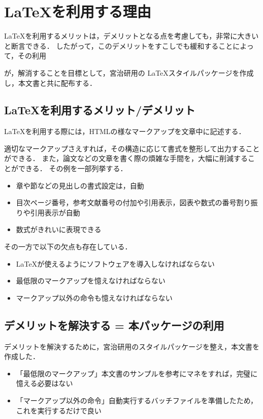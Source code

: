 \section{\LaTeX を利用する理由}
\LaTeX を利用するメリットは，デメリットとなる点を考慮しても，非常に大きいと断言できる．
したがって，このデメリットをすこしでも緩和することによって，その利用

が，解消することを目標として，宮治研用の \LaTeX スタイルパッケージを作成し，本文書と共に配布する．


\subsection{\LaTeX を利用するメリット/デメリット}

\LaTeX を利用する際には，HTMLの様なマークアップを文章中に記述する．

適切なマークアップさえすれば，その構造に応じて書式を整形して出力することができる．
また，論文などの文章を書く際の煩雑な手間を，大幅に削減することができる．
その例を一部列挙する．
\begin{itemize}
\item 章や節などの見出しの書式設定は，自動
\item 目次ページ番号，参考文献番号の付加や引用表示，図表や数式の番号割り振りや引用表示が自動
\item 数式がきれいに表現できる
\end{itemize}

その一方で以下の欠点も存在している\cite{test}．
\begin{itemize}
\item \LaTeX が使えるようにソフトウェアを導入しなければならない
\item 最低限のマークアップを憶えなければならない
\item マークアップ以外の命令も憶えなければならない
\end{itemize}


\subsection{デメリットを解決する = 本パッケージの利用}
デメリットを解決するために，宮治研用のスタイルパッケージを整え，本文書を作成した．

\begin{itemize}
\item 「最低限のマークアップ」本文書のサンプルを参考にマネをすれば，完璧に憶える必要はない
\item 「マークアップ以外の命令」自動実行するバッチファイルを準備したため，これを実行するだけで良い
\end{itemize}

